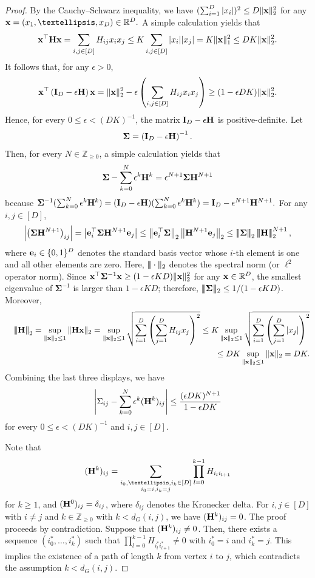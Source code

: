\documentclass[10pt,a4paper]{amsart}
\newcommand{\Tnorm}[1]{\left\vert\mkern-3mu\left\vert\mkern-3mu\left\vert #1 \right\vert\mkern-3mu\right\vert\mkern-3mu\right\vert}
\newcommand{\bH}{{\bf H}}
\newcommand{\bI}{{\bf I}}
\newcommand{\bSigma}{\bm{\Sigma}}
\newcommand{\bbR}{{\mathbb R}}
\newcommand{\bbZ}{{\mathbb Z}}
\newcommand{\be}{\begin{equation}}
\newcommand{\bean}{\setlength\arraycolsep{1pt}\begin{eqnarray*}}
\newcommand{\bfe}{{\bf e}}
\newcommand{\bx}{{\bf x}}
\newcommand{\ee}{\end{equation}}
\newcommand{\eean}{\end{eqnarray*}}
\newcommand{\tnorm}[1]{\vert\mkern-3mu\vert\mkern-3mu\vert #1 \vert\mkern-3mu\vert\mkern-3mu\vert}
\begin{document}
\begin{proof}
By the Cauchy–Schwarz inequality, we have $(\sum_{i=1}^{D} \vert x_i \vert)^2 \leq D \| \bx \|_2^2$ for any $\bx = (x_1,\ldots,x_{D}) \in \bbR^{D}.$
A simple calculation yields that
\bean
\bx^{\top} \bH \bx  = \sum_{i,j \in [D]} H_{ij} x_{i} x_{j}
\leq K  \sum_{i,j \in [D]} \vert x_i \vert \vert x_j \vert = K \| \bx \|_1^2 \leq D K \| \bx \|_2^2.
\eean
It follows that, for any $\epsilon > 0$,
\bean
\bx^{\top} \left( \bI_{D} - \epsilon \bH \right) \bx 
= \| \bx \|_2^2 - \epsilon \left( \sum_{i,j \in [D]} H_{ij} x_i x_j \right)
\geq (1-\epsilon D K)  \| \bx \|_2^2.
\eean
Hence, for every $0 \leq \epsilon < (DK)^{-1}$, the matrix $\bI_{D}-\epsilon \bH$ is positive-definite.
Let
\bean
\bSigma
=
\left( \bI_{D} - \epsilon \bH \right)^{-1}.
\eean
Then, for every $N \in \bbZ_{\geq 0}$, a simple calculation yields that
\bean
\bSigma - \sum_{k=0}^{N} \epsilon^{k} \bH^{k} = \epsilon^{N+1} \bSigma \bH^{N+1}
\eean
because $ \bSigma^{-1}  (\sum_{k=0}^{N} \epsilon^{k} \bH^{k} ) = ( \bI_{D} - \epsilon \bH ) (\sum_{k=0}^{N} \epsilon^{k} \bH^{k} )
= \bI_{D} - \epsilon^{N+1} \bH^{N+1}.$
For any $i,j \in [D]$,
\bean
\left\vert \left( \bSigma \bH^{N+1} \right)_{ij} \right\vert
= \left\vert \bfe_{i}^{\top} \bSigma \bH^{N+1} \bfe_{j} \right\vert
\leq \left\| \bfe_{i}^{\top} \bSigma \right\|_2
\left\| \bH^{N+1} \bfe_{j} \right\|_2
\leq \Tnorm{  \bSigma }_{2} \Tnorm{ \bH }_2^{N+1},
\eean
where $\bfe_{i} \in \{0,1\}^{D}$ denotes the standard basis vector whose $i$-th element is one and all other elements are zero.
Here, $\tnorm{\cdot}_2$ denotes the spectral norm  (or $\ell^2$ operator norm).
Since $\bx^{\top} \bSigma^{-1} \bx \geq (1-\epsilon KD) \| \bx \|_2^2$ for any $\bx \in \bbR^{D}$, the smallest eigenvalue of $\bSigma^{-1}$ is larger than $1-\epsilon  K D$; therefore, $ \tnorm{\bSigma}_2 \leq 1/(1-\epsilon KD)$.
Moreover, 
\bean
&& \Tnorm{\bH}_2 = \sup_{\| \bx \|_2 \leq 1} \| \bH \bx \|_2 = \sup_{\| \bx \|_2 \leq 1} \sqrt{ \sum_{i=1}^{D} \left( \sum_{j=1}^{D} H_{ij} x_j \right)^2 } \leq K \sup_{\| \bx \|_2 \leq 1} \sqrt{ \sum_{i=1}^{D} \left( \sum_{j=1}^{D} \vert x_j \vert \right)^2 }
\\
&& \leq D K \sup_{\| \bx \|_2 \leq 1} \| \bx \|_2 = DK.
\eean
Combining the last three displays, we have
\be
\left\vert \Sigma_{ij} - \sum_{k=0}^{N} \epsilon^{k} (\bH^{k})_{ij} \right\vert
\leq \frac{(\epsilon D K)^{N+1}}{1-\epsilon D K}
\label{eqlem1:errorbd}
\ee
for every $0 \leq \epsilon < (DK)^{-1}$ and $i,j \in [D]$.

Note that
\bean
(\bH^{k})_{ij} = \sum_{ \substack {i_0,\ldots,i_{k} \in [D] \\ i_0 = i, i_k = j }}  \prod_{l=0}^{k-1} H_{i_{l} i_{l+1} }
\eean
for $k \geq 1$, and $(\bH^{0})_{ij} = \delta_{ij}$, where $\delta_{ij}$ denotes the Kronecker delta.
For $i,j \in [D]$ with $i \neq j$ and $k \in \bbZ_{\geq 0}$ with $k < d_{G}(i,j)$, we have $(\bH^{k})_{ij} = 0$.
The proof proceeds by contradiction.
Suppose that $(\bH^k)_{ij} \neq 0$.
Then, there exists a sequence $(i^*_{0},\ldots,i^*_{k})$ such that $\prod_{l=0}^{k-1} H_{i^*_l i^*_{l+1}} \neq 0$ with $i_0^{*} = i$ and $i_{k}^{*} = j$.
This implies the existence of a path of length $k$ from vertex $i$ to $j$, which contradicts the assumption $k < d_{G}(i,j)$. 


\end{proof}
\end{document}
